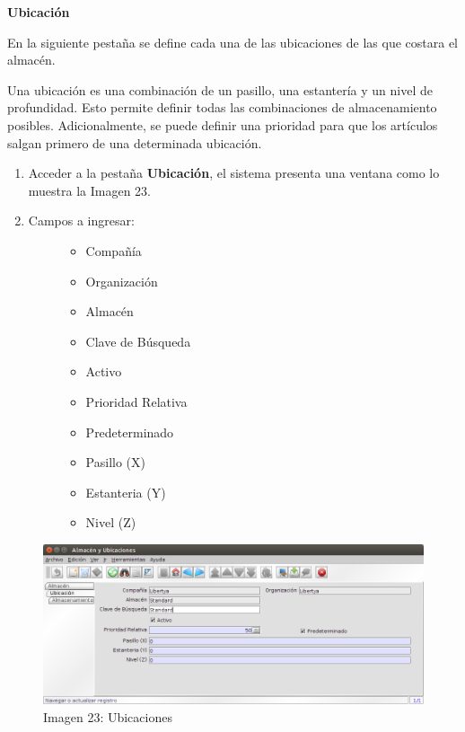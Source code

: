 \documentclass[letterpaper,10pt,spanish]{sphinxmanual}
\begin{document}
\textbf{Ubicación}

En la siguiente pestaña se define cada una de las ubicaciones de las que costara el almacén.

Una ubicación es una combinación de un pasillo, una estantería y un nivel de profundidad. Esto permite definir todas las combinaciones de almacenamiento posibles. Adicionalmente, se puede definir una prioridad para que los artículos salgan primero de una determinada ubicación.
\begin{enumerate}
\item {} 
Acceder a la pestaña \textbf{Ubicación}, el sistema presenta una ventana como lo muestra la Imagen 23.

\item {} \begin{description}
\item[{Campos a ingresar:}] \leavevmode\begin{itemize}
\item {} 
Compañía

\item {} 
Organización

\item {} 
Almacén

\item {} 
Clave de Búsqueda

\item {} 
Activo

\item {} 
Prioridad Relativa

\item {} 
Predeterminado

\item {} 
Pasillo (X)

\item {} 
Estanteria (Y)

\item {} 
Nivel (Z)

\end{itemize}

\end{description}

\end{enumerate}
\begin{figure}[htbp]
\centering
\capstart

\includegraphics{ly_alm2.png}
\caption{Imagen 23: Ubicaciones}\end{figure}
\end{document}
